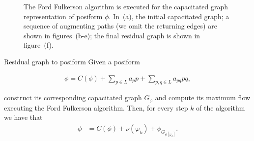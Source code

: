 \begin{figure}
{}%
\caption{The Ford Fulkerson algorithm is executed for the capacitated graph representation of posiform $\phi$. In~(a), the initial capacitated graph; a sequence of augmenting paths (we omit the returning edges) are shown in figures~(b-e); the final residual graph is shown in figure~(f).  }
\label{ch2:fig:posiform-capacitated-graph}
\end{figure}

\begin{proposition}{Residual graph to posiform}
	Given a posiform 
	
	\begin{align*}
		\phi = C(\phi) + \sum_{p \in L}{a_pp} + \sum_{p,q \in L}{a_{pq}pq},
	\end{align*}
	
	construct its corresponding capacitated graph $G_{\phi}$ and compute its maximum flow executing the Ford Fulkerson algorithm. Then, for every step $k$ of the algorithm we have that
	\begin{align*}
		\phi &= C(\phi) + \nu(\varphi_k) + \phi_{ G_{ \phi [\varphi_k]}}.
	\end{align*}
\end{proposition}

